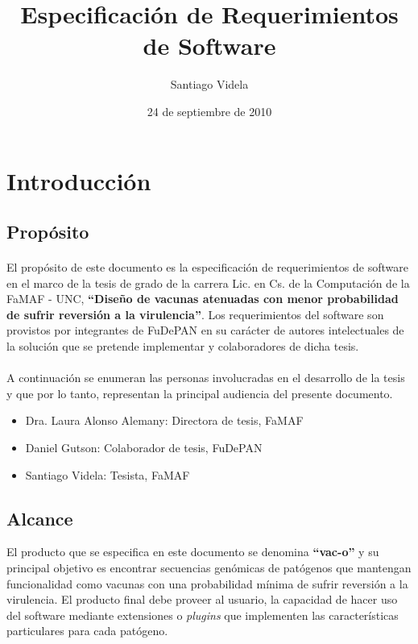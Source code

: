 \documentclass[10pt,a4paper]{article}
\author{Santiago Videla}
\title{Especificaci\'on de Requerimientos de Software}
\date{24 de septiembre de 2010}
\begin{document}
\maketitle
\pagebreak
\tableofcontents
\pagebreak

\section{Introducci\'on}
  \subsection{Prop\'osito}
  \paragraph{}
  El prop\'osito de este documento es la especificaci\'on de requerimientos de
software en el marco de la tesis de grado de la carrera Lic. en Cs. de la
Computaci\'on de la FaMAF - UNC, \textbf{``Dise\~no de vacunas atenuadas con
menor probabilidad de sufrir reversi\'on a la virulencia''}. Los requerimientos
del software son provistos por integrantes de FuDePAN en su car\'acter de
autores intelectuales de la soluci\'on que se pretende implementar y
colaboradores de dicha tesis.

  \paragraph{}
  A continuaci\'on se enumeran las personas involucradas en el desarrollo de la
tesis y que por lo tanto, representan la principal audiencia del presente
documento.
  \begin{itemize}
  \item Dra. Laura Alonso Alemany: Directora de tesis, FaMAF
  \item Daniel Gutson: Colaborador de tesis, FuDePAN
  \item Santiago Videla: Tesista, FaMAF
  \end{itemize}  
 
  \subsection{Alcance}
  El producto que se especifica en este documento se denomina \textbf{``vac-o''}
y su principal objetivo es encontrar secuencias gen\'omicas de pat\'ogenos que
mantengan funcionalidad como vacunas con una probabilidad m\'inima de sufrir
reversi\'on a la virulencia. El producto final debe proveer al usuario, la
capacidad de hacer uso del software mediante extensiones o \textit{plugins} que
implementen las caracter\'isticas particulares para cada pat\'ogeno. 
  
\end{document}
